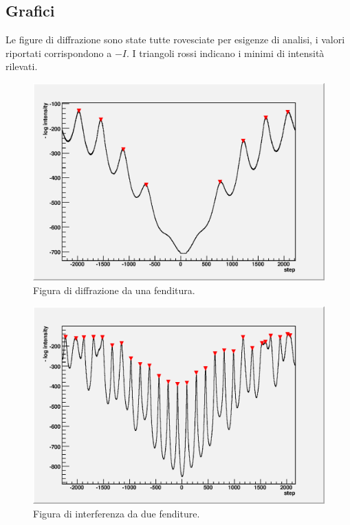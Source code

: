 \documentclass[italian,a4paper]{article}
\begin{document}
\subsection*{Grafici}
Le figure di diffrazione sono state tutte rovesciate per esigenze di analisi, i valori riportati corrispondono a $-I$. I triangoli rossi indicano i minimi di intensità rilevati.
\begin{figure}[!h]\centering
\includegraphics[scale=.6]{1slit.outint.eps}
\caption{Figura di diffrazione da una fenditura.}\label{1slitint}
\end{figure}
\begin{figure}[ph]\centering
\includegraphics[scale=.6]{2slits.outint.eps}
\caption{Figura di interferenza da due fenditure.}\label{2slitsint}
\end{figure}
\end{document}
